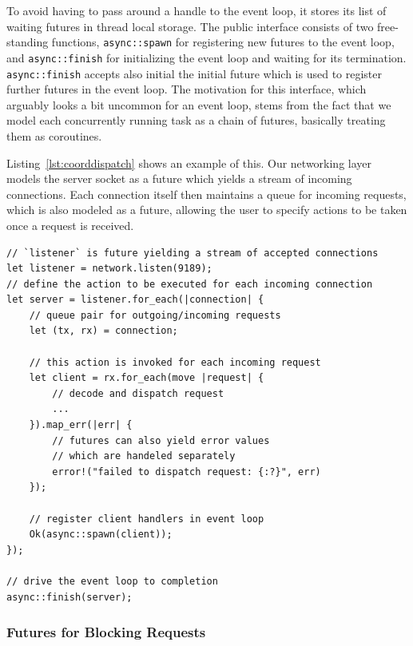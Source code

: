 To avoid having to pass around a handle to the event loop, it stores its 
list of waiting futures in thread local storage. The public interface consists 
of two free-standing functions, \lstinline{async::spawn} for registering
new futures to the event loop, and \lstinline{async::finish} for initializing
the event loop and waiting for its termination. \lstinline{async::finish} accepts
also initial the initial future which is used to register further futures in
the event loop. The motivation for this interface, which arguably looks
a bit uncommon for an event loop, stems from the fact that we model each
concurrently running task as a chain of futures, basically treating them as
coroutines.  

Listing~\ref{lst:coorddispatch} shows an example of this. Our networking layer
models the server socket as a future which yields a stream of incoming connections.
Each connection itself then maintains a queue for incoming requests, which is
also modeled as a future, allowing the user to specify actions to be taken
once a request is received.

\begin{lstlisting}[caption={[Connection handling at the coordinator]%
Accepting and dispatching incoming connections. The actions specified
in \lstinline{for_each} and \lstinline{map_err} are invoked by the
event loop if the corresponding events (such as new incoming connections,
new incoming requests or errors during request handling) occur.},label={lst:coorddispatch}]
// `listener` is future yielding a stream of accepted connections
let listener = network.listen(9189);
// define the action to be executed for each incoming connection
let server = listener.for_each(|connection| {
    // queue pair for outgoing/incoming requests
    let (tx, rx) = connection;
   
    // this action is invoked for each incoming request
    let client = rx.for_each(move |request| {
        // decode and dispatch request 
        ...
    }).map_err(|err| {
        // futures can also yield error values
        // which are handeled separately
        error!("failed to dispatch request: {:?}", err)
    });

    // register client handlers in event loop
    Ok(async::spawn(client));
});

// drive the event loop to completion
async::finish(server);
\end{lstlisting}

\subsubsection{Futures for Blocking Requests}

